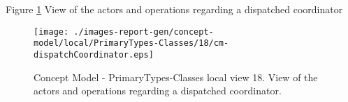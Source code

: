 Figure \ref{fig:lu.uni.lassy.excalibur.group09.spec-CM-view-local-PrimaryTypes-Classes-18} View of the actors and operations regarding a dispatched coordinator



\begin{figure}[htbp] 
\label{fig:lu.uni.lassy.excalibur.group09.spec-CM}
\begin{center}
\texttt{[image: ./images-report-gen/concept-model/local/PrimaryTypes-Classes/18/cm-dispatchCoordinator.eps]}
\end{center}
\caption[Concept Model - PrimaryTypes-Classes local view 18 - View of the actors and operations re]{Concept Model - PrimaryTypes-Classes local view 18. View of the actors and operations regarding a dispatched coordinator.}
\label{fig:lu.uni.lassy.excalibur.group09.spec-CM-view-local-PrimaryTypes-Classes-18}
\end{figure}
\vspace{0.5cm} 
